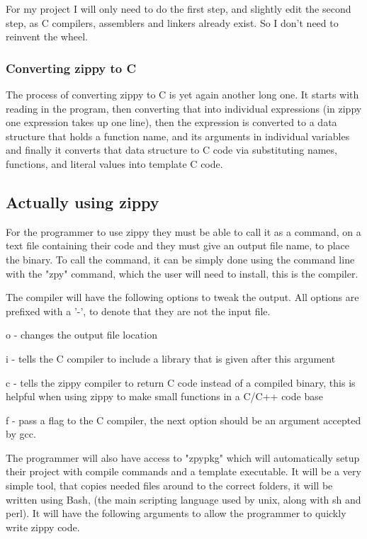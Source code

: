 \documentclass[a4paper,12pt]{article}
\begin{document}
{For my project I will only need to do the first step, and slightly edit the second step, as C compilers, assemblers
and linkers already exist. So I don't need to reinvent the wheel.
\subsubsection{Converting zippy to C}
The process of converting zippy to C is yet again another long one. It starts with reading in the program, 
then converting that into individual expressions (in zippy one expression takes up one line), then the expression
is converted to a data structure that holds a function name, and its arguments in individual variables and finally
it converts that data structure to C code via substituting names, functions, and literal values into template C code.
\subsection{Actually using zippy}
For the programmer to use zippy they must be able to call it as a command, on a text file containing their code and
they must give an output file name, to place the binary. To call the command, it can be simply done using the command
line with the "zpy" command, which the user will need to install, this is the compiler.

The compiler will have the following options to tweak the output.
All options are prefixed with a '-', to denote that they are not the input file.

\begin{description}
	\item{o} - changes the output file location
	\item{i} - tells the C compiler to include a library that is given after this argument
	\item{c} - tells the zippy compiler to return C code instead of a compiled binary,
		this is helpful when using zippy to make small functions in a C/C++ code
		base
	\item{f} - pass a flag to the C compiler, the next option should be an argument 
		accepted by gcc.
\end{description}

The programmer will also have access to "zpypkg" which will automatically setup their project with compile commands 
and a template executable. It will be a very simple tool, that copies needed files around to the correct folders,
it will be written using Bash, (the main scripting language used by unix, along with sh and perl). It will have the 
following arguments to allow the programmer to quickly write zippy code.

}
\end{document}
